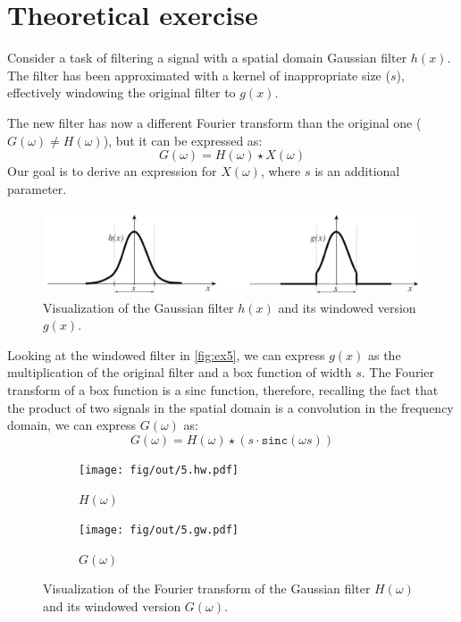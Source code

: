 \documentclass[tikz,14pt,fleqn]{article}
\begin{document}
\section{Theoretical exercise}
Consider a task of filtering a signal with a spatial domain Gaussian filter $h(x)$. 
The filter has been approximated with a kernel of inappropriate size ($s$), effectively windowing the original filter to $g(x)$.

The new filter has now a different Fourier transform than the original one ($G(\omega) \neq H(\omega)$), but it can be expressed as:
\begin{equation*}
    G(\omega) = H(\omega) \star X(\omega)
\end{equation*}
Our goal is to derive an expression for $X(\omega)$, where $s$ is an additional parameter.

\begin{figure}[H]
    \centering
    \includegraphics[width=0.8\linewidth]{fig/5.hx-gx.png}
    \caption{Visualization of the Gaussian filter $h(x)$ and its windowed version $g(x)$.}
    \label{fig:ex5}
\end{figure}

Looking at the windowed filter in \autoref{fig:ex5}, we can express $g(x)$ as the multiplication of the original filter and a box function of width $s$. The Fourier transform of a box function is a sinc function, therefore, recalling the fact that the product of two signals in the spatial domain is a convolution in the frequency domain, we can express $G(\omega)$ as:
\begin{equation*}
    G(\omega) = H(\omega) \star (s\cdot\texttt{sinc}(\omega s))
\end{equation*}

\begin{figure}[H]
    \centering
    \begin{subfigure}{0.49\linewidth}
        \centering
        \texttt{[image: fig/out/5.hw.pdf]}
        \caption{$H(\omega)$}
        \label{fig:ex5-Hw}
    \end{subfigure}
    \begin{subfigure}{0.49\linewidth}
        \centering
        \texttt{[image: fig/out/5.gw.pdf]}
        \caption{$G(\omega)$}
        \label{fig:ex5-Gw}
    \end{subfigure}
    \caption{Visualization of the Fourier transform of the Gaussian filter $H(\omega)$ and its windowed version $G(\omega)$.}
    \label{fig:ex5-Hw-Gw}
\end{figure}
\end{document}
